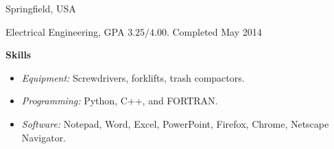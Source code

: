 \documentclass[letter,11pt]{article}
\begin{document}
 \hfill Springfield, USA

 Electrical Engineering, GPA $3.25/4.00.$  \hfill Completed May 2014
  
\vspace{3mm}


\noindent\textbf  {\large Skills} \vspace{2mm}
\begin{itemize}[itemsep=0.05mm,topsep=0mm, label=\textrm{•}]

\item {\sl Equipment:} Screwdrivers, forklifts, trash compactors.

\item {\sl Programming:} Python, C++, and FORTRAN.

\item {\sl Software:} Notepad, Word, Excel, PowerPoint, Firefox, Chrome, Netscape Navigator.

\end{itemize}
\end{document}
